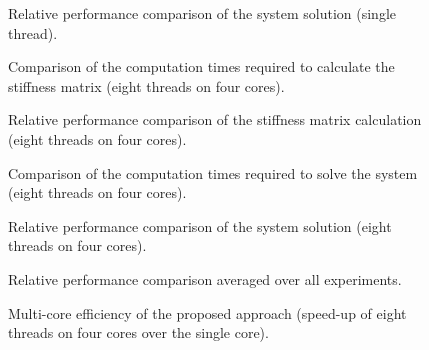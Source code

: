 \begin{figure}[h]
\centerline{}
\caption{Relative performance comparison of the system solution (single thread).}
\label{fig:singleSystemi7}
\end{figure}

\begin{figure}[h]
\centerline{}
\caption{Comparison of the computation times required to calculate the stiffness matrix (eight threads on four cores).}
\label{fig:multiStiffi7CT}
\end{figure}

\begin{figure}[h]
\centerline{}
\caption{Relative performance comparison of the stiffness matrix calculation (eight threads on four cores).}
\label{fig:multiStiffi7}
\end{figure}

\begin{figure}[h]
\centerline{}
\caption{Comparison of the computation times required to solve the system (eight threads on four cores).}
\label{fig:multiSystemi7CT}
\end{figure}

\begin{figure}[h]
\centerline{}
\caption{Relative performance comparison of the system solution (eight threads on four cores).}
\label{fig:multiSystemi7}
\end{figure}

\begin{figure}[h]
\centerline{}
\caption{Relative performance comparison averaged over all experiments.}
\label{fig:averagei7}
\end{figure}

\begin{figure}[h]
\centerline{}
\caption{Multi-core efficiency of the proposed approach (speed-up of eight threads on four cores over the single core).}
\label{fig:mcEfficiencyi7}
\end{figure}
